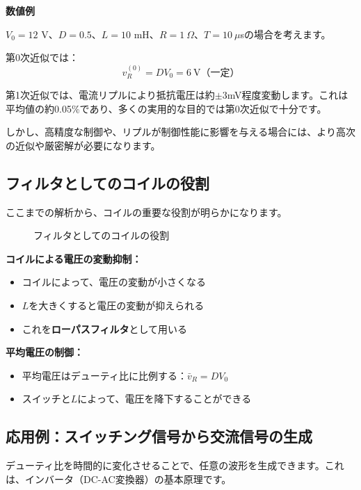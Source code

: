 \textbf{数値例}

$V_0 = 12$ V、$D = 0.5$、$L = 10$ mH、$R = 1~\Omega$、$T = 10~\mu$sの場合を考えます。

第0次近似では：
\begin{equation}
v_R^{(0)} = DV_0 = 6~\text{V（一定）}
\end{equation}

第1次近似では、電流リプルにより抵抗電圧は約$\pm 3$mV程度変動します。これは平均値の約0.05\%であり、多くの実用的な目的では第0次近似で十分です。

しかし、高精度な制御や、リプルが制御性能に影響を与える場合には、より高次の近似や厳密解が必要になります。

\subsection{フィルタとしてのコイルの役割}

ここまでの解析から、コイルの重要な役割が明らかになります。

\begin{figure}[H]
\centering
{}
\caption{フィルタとしてのコイルの役割}
\label{fig:ch04_inductor_filter}
\end{figure}

\textbf{コイルによる電圧の変動抑制：}

\begin{itemize}
\item コイルによって、電圧の変動が小さくなる
\item $L$を大きくすると電圧の変動が抑えられる
\item これを\textbf{ローパスフィルタ}として用いる
\end{itemize}

\textbf{平均電圧の制御：}

\begin{itemize}
\item 平均電圧はデューティ比に比例する：$\bar{v}_R = DV_0$
\item スイッチと$L$によって、電圧を降下することができる
\end{itemize}

\subsection{応用例：スイッチング信号から交流信号の生成}

デューティ比を時間的に変化させることで、任意の波形を生成できます。これは、インバータ（DC-AC変換器）の基本原理です。

